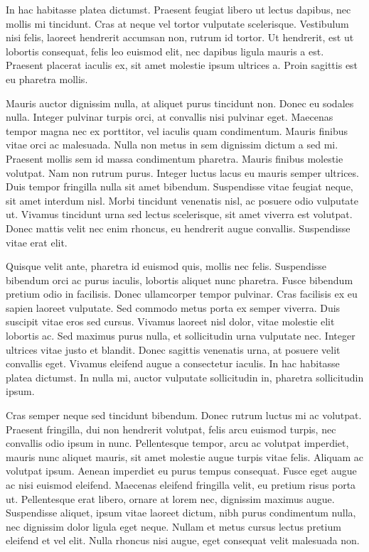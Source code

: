 \documentclass{article}
\begin{document}
In hac habitasse platea dictumst. Praesent feugiat libero ut lectus dapibus, nec mollis mi tincidunt. Cras at neque vel tortor vulputate scelerisque. Vestibulum nisi felis, laoreet hendrerit accumsan non, rutrum id tortor. Ut hendrerit, est ut lobortis consequat, felis leo euismod elit, nec dapibus ligula mauris a est. Praesent placerat iaculis ex, sit amet molestie ipsum ultrices a. Proin sagittis est eu pharetra mollis.

Mauris auctor dignissim nulla, at aliquet purus tincidunt non. Donec eu sodales nulla. Integer pulvinar turpis orci, at convallis nisi pulvinar eget. Maecenas tempor magna nec ex porttitor, vel iaculis quam condimentum. Mauris finibus vitae orci ac malesuada. Nulla non metus in sem dignissim dictum a sed mi. Praesent mollis sem id massa condimentum pharetra. Mauris finibus molestie volutpat. Nam non rutrum purus. Integer luctus lacus eu mauris semper ultrices. Duis tempor fringilla nulla sit amet bibendum. Suspendisse vitae feugiat neque, sit amet interdum nisl. Morbi tincidunt venenatis nisl, ac posuere odio vulputate ut. Vivamus tincidunt urna sed lectus scelerisque, sit amet viverra est volutpat. Donec mattis velit nec enim rhoncus, eu hendrerit augue convallis. Suspendisse vitae erat elit.

Quisque velit ante, pharetra id euismod quis, mollis nec felis. Suspendisse bibendum orci ac purus iaculis, lobortis aliquet nunc pharetra. Fusce bibendum pretium odio in facilisis. Donec ullamcorper tempor pulvinar. Cras facilisis ex eu sapien laoreet vulputate. Sed commodo metus porta ex semper viverra. Duis suscipit vitae eros sed cursus. Vivamus laoreet nisl dolor, vitae molestie elit lobortis ac. Sed maximus purus nulla, et sollicitudin urna vulputate nec. Integer ultrices vitae justo et blandit. Donec sagittis venenatis urna, at posuere velit convallis eget. Vivamus eleifend augue a consectetur iaculis. In hac habitasse platea dictumst. In nulla mi, auctor vulputate sollicitudin in, pharetra sollicitudin ipsum.

Cras semper neque sed tincidunt bibendum. Donec rutrum luctus mi ac volutpat. Praesent fringilla, dui non hendrerit volutpat, felis arcu euismod turpis, nec convallis odio ipsum in nunc. Pellentesque tempor, arcu ac volutpat imperdiet, mauris nunc aliquet mauris, sit amet molestie augue turpis vitae felis. Aliquam ac volutpat ipsum. Aenean imperdiet eu purus tempus consequat. Fusce eget augue ac nisi euismod eleifend. Maecenas eleifend fringilla velit, eu pretium risus porta ut. Pellentesque erat libero, ornare at lorem nec, dignissim maximus augue. Suspendisse aliquet, ipsum vitae laoreet dictum, nibh purus condimentum nulla, nec dignissim dolor ligula eget neque. Nullam et metus cursus lectus pretium eleifend et vel elit. Nulla rhoncus nisi augue, eget consequat velit malesuada non.
\end{document}
